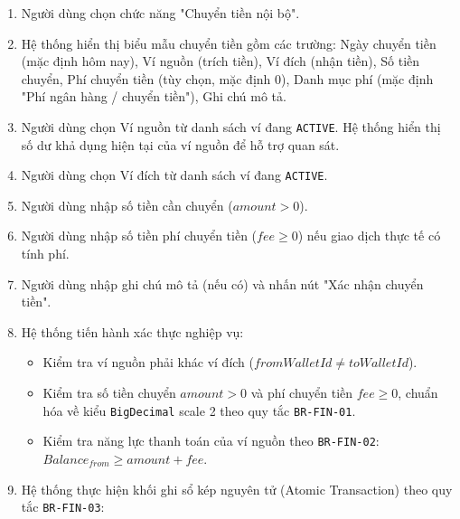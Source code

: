 \documentclass[11pt,a4paper]{article}
\providecommand{\tightlist}{
  \setlength{\itemsep}{0pt}\setlength{\parskip}{0pt}}
\begin{document}
\begin{itemize}
  \begin{enumerate}
  \def\labelenumi{\arabic{enumi}.}
  \tightlist
  \item
    Người dùng chọn chức năng "Chuyển tiền nội bộ".
  \item
    Hệ thống hiển thị biểu mẫu chuyển tiền gồm các trường: Ngày chuyển
    tiền (mặc định hôm nay), Ví nguồn (trích tiền), Ví đích (nhận tiền),
    Số tiền chuyển, Phí chuyển tiền (tùy chọn, mặc định 0), Danh mục phí
    (mặc định "Phí ngân hàng / chuyển tiền"), Ghi chú mô tả.
  \item
    Người dùng chọn Ví nguồn từ danh sách ví đang \texttt{ACTIVE}. Hệ
    thống hiển thị số dư khả dụng hiện tại của ví nguồn để hỗ trợ quan
    sát.
  \item
    Người dùng chọn Ví đích từ danh sách ví đang \texttt{ACTIVE}.
  \item
    Người dùng nhập số tiền cần chuyển (\(amount > 0\)).
  \item
    Người dùng nhập số tiền phí chuyển tiền (\(fee \ge 0\)) nếu giao
    dịch thực tế có tính phí.
  \item
    Người dùng nhập ghi chú mô tả (nếu có) và nhấn nút "Xác nhận chuyển
    tiền".
  \item
    Hệ thống tiến hành xác thực nghiệp vụ:

    \begin{itemize}
    \tightlist
    \item
      Kiểm tra ví nguồn phải khác ví đích
      (\(fromWalletId \ne toWalletId\)).
    \item
      Kiểm tra số tiền chuyển \(amount > 0\) và phí chuyển tiền
      \(fee \ge 0\), chuẩn hóa về kiểu \texttt{BigDecimal} scale 2 theo
      quy tắc \texttt{BR-FIN-01}.
    \item
      Kiểm tra năng lực thanh toán của ví nguồn theo \texttt{BR-FIN-02}:
      \(Balance_{from} \ge amount + fee\).
    \end{itemize}
  \item
    Hệ thống thực hiện khối ghi sổ kép nguyên tử (Atomic Transaction)
    theo quy tắc \texttt{BR-FIN-03}:


\end{enumerate}
\end{itemize}
\end{document}

